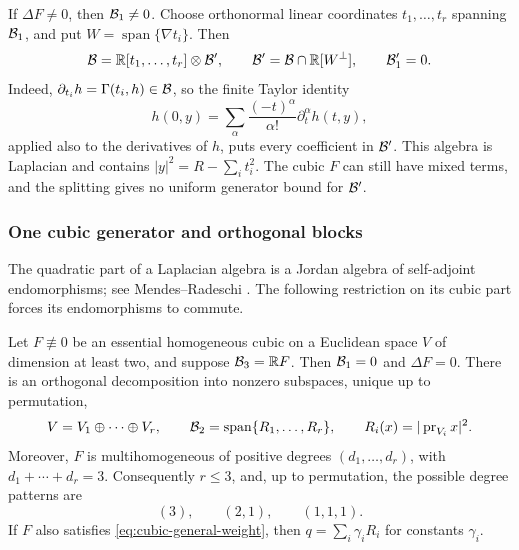 \begin{remark}
\label{rem:cubic-nonharmonic-linear-splitting}
If \(\Delta F\ne0\), then \(\mathcal B_1\ne0\). Choose orthonormal
linear coordinates \(t_1,\ldots,t_r\) spanning \(\mathcal B_1\), and put
\(W=\operatorname{span}\{\nabla t_i\}\). Then
\[
 \mathcal B=\mathbb R[t_1,\ldots,t_r]\otimes\mathcal B',\qquad
 \mathcal B'=\mathcal B\cap\mathbb R[W^\perp],\qquad \mathcal B'_1=0.
\]
Indeed, \(\partial_{t_i}h=\Gamma(t_i,h)\in\mathcal B\), so the finite
Taylor identity
\[
 h(0,y)=\sum_\alpha\frac{(-t)^\alpha}{\alpha!}\partial_t^\alpha h(t,y),
\]
applied also to the derivatives of \(h\), puts every coefficient
in \(\mathcal B'\). This algebra is Laplacian and contains
\(|y|^2=R-\sum_i t_i^2\). The cubic \(F\) can still have mixed
terms, and the splitting gives no uniform generator bound for \(\mathcal B'\).
\end{remark}

\subsubsection{One cubic generator and orthogonal blocks}

The quadratic part of a Laplacian algebra is a Jordan algebra of
self-adjoint endomorphisms; see Mendes--Radeschi
\cite{MendesRadeschiQuadratic}. The following restriction on its
cubic part forces its endomorphisms to commute.

\begin{theorem}
\label{thm:cubic-one-dimensional-degree-three}
Let \(F\not\equiv0\) be an essential homogeneous cubic on a Euclidean
space \(V\) of dimension at least two, and suppose
\(\mathcal B_3=\mathbb R F\). Then \(\mathcal B_1=0\) and \(\Delta F=0\).
There is an orthogonal decomposition into nonzero subspaces,
unique up to permutation,
\begin{equation}\label{eq:cubic-canonical-blocks}
 V=V_1\oplus\cdots\oplus V_r,\qquad
 \mathcal B_2=\operatorname{span}\{R_1,\ldots,R_r\},\qquad
 R_i(x)=|\operatorname{pr}_{V_i}x|^2.
\end{equation}
Moreover, \(F\) is multihomogeneous of positive degrees
\((d_1,\ldots,d_r)\), with \(d_1+\cdots+d_r=3\).
Consequently \(r\leq3\), and, up to permutation, the possible degree
patterns are
\[
 (3),\qquad (2,1),\qquad (1,1,1).
\]
If \(F\) also satisfies \eqref{eq:cubic-general-weight}, then
\(q=\sum_i\gamma_iR_i\) for constants \(\gamma_i\).
\end{theorem}

